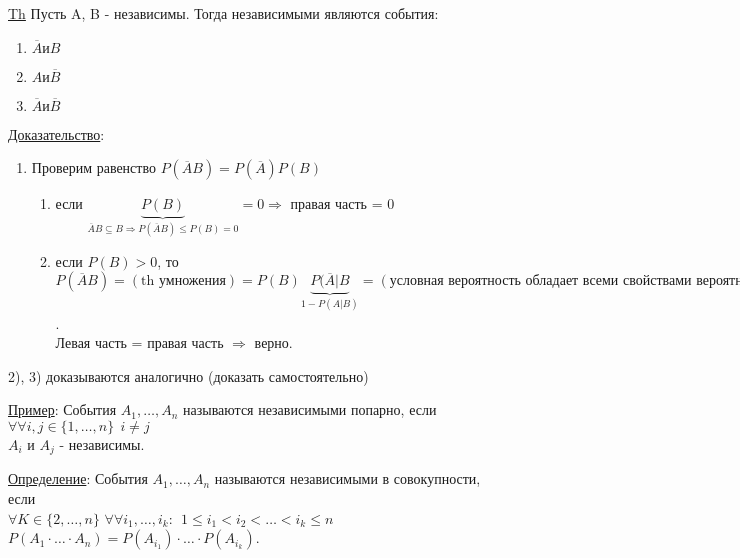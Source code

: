 \underline{Th} Пусть A, B - независимы. Тогда независимыми являются события: \\
\begin{enumerate}
	\item[1)] 
	$\overline{A} \text{и} B$ \\
	
	\item[2)]
	$A \text{и} \overline{B}$
	
	\item[3)]
	$\overline{A} \text{и} \overline{B}$
\end{enumerate}

\underline{Доказательство}:
\begin{enumerate}
	\item[1)]
	Проверим равенство $P(\overline{A}B) = P(\overline{A}) P(B)$
	\begin{enumerate}
		\item[а)]
		если $\underbrace{P(B)}_{\overline{A}B \subseteq B \Rightarrow P(\overline{A}B) \leqslant P(B) = 0} = 0 \Rightarrow$ правая часть = 0 
		
		\item[б)]
		если $P(B) > 0$, то $P(\overline{A} B) = (\text{th умножения}) = P(B) \underbrace{P(\overline{A} | B}_{1 - P(A|B)} = (\text{условная вероятность обладает всеми свойствами вероятности}) = P(B) (1 - P(A|B) = (\text{A,B - независимы} \Rightarrow P(A|B) = P(A)) = P(B) \underbrace{1 - P(A)}_{P(\overline{A})} = P(\overline{A}) P(B)$. \\
		Левая часть = правая часть $\Rightarrow$ верно.
	\end{enumerate}
\end{enumerate}

2), 3) доказываются аналогично (доказать самостоятельно)

\underline{Пример}: События $A_1, \ldots , A_n$ называются независимыми попарно, если \\
$\forall \forall i,j \in \{1, \ldots , n\} \ \ i \neq j$ \\
$A_i$ и $A_j$ - независимы.

\underline{Определение}: События $A_1, \ldots , A_n$ называются независимыми в совокупности, если \\ 
$\forall K \in \{2, \ldots , n \}$ $\forall \forall i_1, \ldots , i_k: \ \ 1 \leqslant i_1 < i_2 < \ldots < i_k \leqslant n$ \\
$P(A_1 \cdot \ldots \cdot A_n) = P(A_{i_1}) \cdot \ldots \cdot P(A_{i_k})$.

